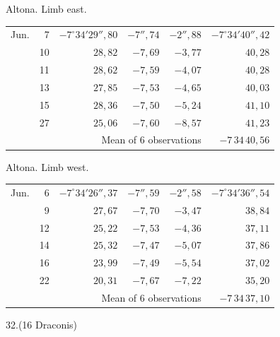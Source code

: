 \noindent\begin{minipage}[t]{.495\textwidth}\centering Altona. Limb east.\par\smallskip
{\scriptsize\setlength{\tabcolsep}{1pt}\renewcommand{\arraystretch}{1.2}\begin{tabular}{lr|r|r|r|r|}
Jun.&7&$-7^\circ34'29''{,}80$&$-7''{,}74$&$-2''{,}88$&$-7^\circ34'40''{,}42$\\
&10&$28{,}82$&$-7{,}69$&$-3{,}77$&$40{,}28$\\
&11&$28{,}62$&$-7{,}59$&$-4{,}07$&$40{,}28$\\
&13&$27{,}85$&$-7{,}53$&$-4{,}65$&$40{,}03$\\
&15&$28{,}36$&$-7{,}50$&$-5{,}24$&$41{,}10$\\
&27&$25{,}06$&$-7{,}60$&$-8{,}57$&$41{,}23$\\
\cline{6-6}\multicolumn{5}{r}{Mean of 6 observations}&$-7\,34\,40{,}56$
\end{tabular}}\end{minipage}\hfill\begin{minipage}[t]{.495\textwidth}\centering Altona. Limb west.\par\smallskip
{\scriptsize\setlength{\tabcolsep}{1pt}\renewcommand{\arraystretch}{1.2}\begin{tabular}{lr|r|r|r|r}
Jun.&6&$-7^\circ34'26''{,}37$&$-7''{,}59$&$-2''{,}58$&$-7^\circ34'36''{,}54$\\
&9&$27{,}67$&$-7{,}70$&$-3{,}47$&$38{,}84$\\
&12&$25{,}22$&$-7{,}53$&$-4{,}36$&$37{,}11$\\
&14&$25{,}32$&$-7{,}47$&$-5{,}07$&$37{,}86$\\
&16&$23{,}99$&$-7{,}49$&$-5{,}54$&$37{,}02$\\
&22&$20{,}31$&$-7{,}67$&$-7{,}22$&$35{,}20$\\
\cline{6-6}\multicolumn{5}{r}{Mean of 6 observations}&$-7\,34\,37{,}10$
\end{tabular}}\end{minipage}
\par\vspace{4mm}
\begin{center}32.\quad (16 Draconis)\end{center}

